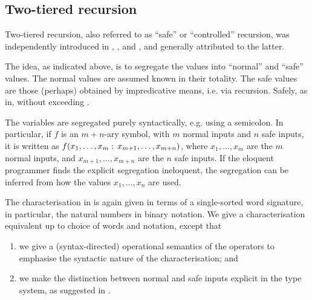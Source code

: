 



\subsection{Two-tiered recursion}

Two-tiered recursion, also referred to as ``safe'' or ``controlled'' recursion,
was independently introduced in \cite{simmons-1988}, \cite{leivant-1990}, and
\cite{bellantoni-cook-1992}, and generally attributed to the latter.

The idea, as indicated above, is to segregate the values into ``normal'' and
``safe'' values. The normal values are assumed known in their totality. The
safe values are those (perhaps) obtained by impredicative means, i.e. via
recursion\cite{bellantoni-cook-1992, clote-1999}. Safely, as in, without
exceeding \FPTIME{}.

The variables are segregated purely syntactically, e.g. using a semicolon. In
particular, if $f$ is an $m+n$-ary symbol, with $m$ normal inputs and $n$ safe
inputs, it is written as $f{\mathopen{}\left({x_1,\ldots,x_m \mathrel{};\mathrel{}{} x_{m+1},\ldots,x_{m+n}}\right)\mathclose{}}$,
where $x_1,\ldots,x_m$ are the $m$ normal inputs, and $x_{m+1},\ldots,x_{m+n}$
are the $n$ safe inputs. If the eloquent programmer finds the explicit
segregation ineloquent, the segregation can be inferred from how the values
$x_1,\ldots,x_n$ are used\cite{caseiro-1996}.

The characterisation in \cite{bellantoni-cook-1992} is again given in terms of
a single-sorted word signature, in particular, the natural numbers in binary
notation. We give a characterisation equivalent up to choice of words and
notation, except that

\begin{enumerate}[label=(\arabic*)]

\item we give a (syntax-directed) operational semantics of the operators to
emphasise the syntactic nature of the characterisation; and

\item we make the distinction between normal and safe inputs explicit in the
type system, as suggested in \cite[\textsection\ 5]{bellantoni-cook-1992}.

\end{enumerate}

